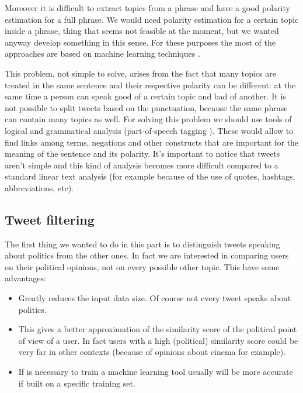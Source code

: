 \documentclass[a4paper,11pt,oneside]{article}
\begin{document}
Moreover it is difficult to extract topics from a phrase and have a good polarity estimation for a full phrase. We would need polarity estimation for a certain topic inside a phrase, thing that seems not feasible at the moment, but we wanted anyway develop something in this sense.
For these purposes the most of the approaches are based on machine learning techniques \cite{sentiment, baccianella}.

This problem, not simple to solve, arises from the fact that many topics are treated in the same sentence and their respective polarity can be different: at the same time a person can speak good of a certain topic and bad of another. It is not possible to split tweets based on the punctuation, because the same phrase can contain many topics as well. For solving this problem we should use tools of logical and grammatical analysis (part-of-speech tagging \cite{pos}). These would allow to find links among terms, negations and other constructs that are important for the meaning of the sentence and its polarity.
It's important to notice that tweets aren't simple and this kind of analysis becomes more difficult compared to a standard linear text analysis (for example because of the use of quotes, hashtags, abbreviations, etc). 


\subsection{Tweet filtering}
The first thing we wanted to do in this part is to distinguish tweets speaking about politics from the other ones. In fact we are interested in comparing users on their political opinions, not on every possible other topic. This have some advantages:
\begin{itemize}
\item Greatly reduces the input data size. Of course not every tweet speaks about politics.
\item This gives a better approximation of the similarity score of the political point of view of a user. In fact users with a high (political) similarity score could be very far in other contexts (because of opinions about cinema for example).
\item If is necessary to train a machine learning tool usually will be more accurate if built on a specific training set.
\end{itemize}
\end{document}
